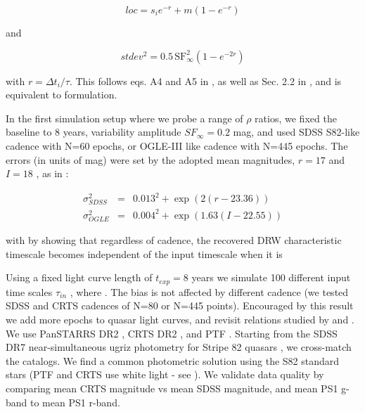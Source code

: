\documentclass[twocolumn]{aastex62}
\begin{document}
\begin{equation}
loc = s_{i} e ^ { - r  }  + m \left( 1 - e ^{ - r }\right)
\end{equation}

and 

\begin{equation}
stdev^{2} =  0.5  \, \mathrm{SF}_{\infty}^{2} \left( 1 - e ^{  - 2 r  }  \right)
\end{equation}

with  $r = \Delta t_{i} / \tau$.  This follows eqs. A4 and A5 in \cite{kelly2009}, as well as Sec. 2.2 in \cite{macleod2010}, and is equivalent to  \cite{kozlowski2017a} formulation. 


In the first simulation setup where we probe a range of $\rho$ ratios, we fixed the baseline to $8$ years, variability amplitude  $SF_{\infty} = 0.2$ mag, and used SDSS S82-like cadence with N=60 epochs, or OGLE-III like cadence with N=445 epochs.  The errors (in units of mag) were set by the adopted mean magnitudes, $r=17$ and $I=18$ , as in \cite{kozlowski2017a} :

\begin{eqnarray}
\sigma_{SDSS}^{2} &=& 0.013^{2} + \exp{(2 (r-23.36))} \\
\sigma_{OGLE}^{2} &=& 0.004^{2} + \exp{(1.63 (I - 22.55))}
\end{eqnarray}



with     by showing that regardless of cadence, the recovered DRW characteristic timescale becomes independent of the input timescale when it is 


Using a fixed light curve length of $t_{exp} = 8$ years we simulate 100 different input time scales $\tau_{in}$ ,  where  .  The bias is not affected by different cadence (we tested SDSS and CRTS cadences of N=80 or N=445 points).
Encouraged by this result we add more epochs to quasar light curves, and revisit relations studied by  \cite{macleod2011} and \cite{hernitschek2016}. We use PanSTARRS \citep{chambers2011} DR2 \citep{flewelling2018}, CRTS DR2 \citep{drake2009}, and PTF \citep{rau2009}. Starting from the SDSS  DR7 near-simultaneous ugriz photometry for Stripe 82 quasars \citep{schneider2008}, we cross-match the catalogs. We find a common photometric solution using the S82 standard stars (PTF and CRTS use white light - see \citealt{djorgovski2011a}). We validate data quality by comparing mean CRTS magnitude vs mean SDSS magnitude, and mean PS1 g-band to mean PS1 r-band. 
\end{document}
